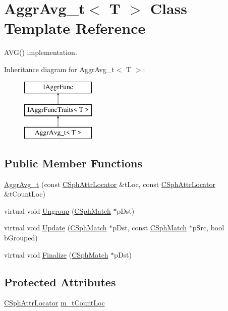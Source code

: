 \hypertarget{classAggrAvg__t}{\section{Aggr\-Avg\-\_\-t$<$ T $>$ Class Template Reference}
\label{classAggrAvg__t}
}


A\-V\-G() implementation.  


Inheritance diagram for Aggr\-Avg\-\_\-t$<$ T $>$\-:\begin{figure}[H]
\begin{center}
\leavevmode
\includegraphics[height=3.000000cm]{classAggrAvg__t}
\end{center}
\end{figure}
\subsection*{Public Member Functions}
\begin{DoxyCompactItemize}
\item 
\hyperlink{classAggrAvg__t_a91dd5207b6e7e347e7dccb70a4ae7b2d}{Aggr\-Avg\-\_\-t} (const \hyperlink{structCSphAttrLocator}{C\-Sph\-Attr\-Locator} \&t\-Loc, const \hyperlink{structCSphAttrLocator}{C\-Sph\-Attr\-Locator} \&t\-Count\-Loc)
\item 
virtual void \hyperlink{classAggrAvg__t_a737fc5c9179701faa1ad8fb064bd878d}{Ungroup} (\hyperlink{classCSphMatch}{C\-Sph\-Match} $\ast$p\-Dst)
\item 
virtual void \hyperlink{classAggrAvg__t_a188d56c0a65940ae45173364f82842b9}{Update} (\hyperlink{classCSphMatch}{C\-Sph\-Match} $\ast$p\-Dst, const \hyperlink{classCSphMatch}{C\-Sph\-Match} $\ast$p\-Src, bool b\-Grouped)
\item 
virtual void \hyperlink{classAggrAvg__t_a0faf1a12f61e5d0022f9aa149a280f34}{Finalize} (\hyperlink{classCSphMatch}{C\-Sph\-Match} $\ast$p\-Dst)
\end{DoxyCompactItemize}
\subsection*{Protected Attributes}
\begin{DoxyCompactItemize}
\item 
\hyperlink{structCSphAttrLocator}{C\-Sph\-Attr\-Locator} \hyperlink{classAggrAvg__t_abc5933d31dbec5a3de4e5fbcad62ef3d}{m\-\_\-t\-Count\-Loc}
\end{DoxyCompactItemize}



